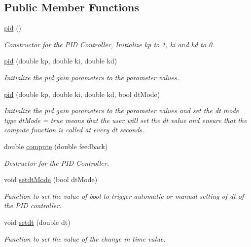 \subsection*{Public Member Functions}
\begin{DoxyCompactItemize}
\item 
\hyperlink{classpid_a8cb9ff8fa0e7162d275990d01fb1588d}{pid} ()
\begin{DoxyCompactList}\small\item\em Constructor for the P\+ID Controller, Initialize kp to 1, ki and kd to 0. \end{DoxyCompactList}\item 
\hyperlink{classpid_aca31b4446bc7cafef37bf0ed799433c5}{pid} (double kp, double ki, double kd)
\begin{DoxyCompactList}\small\item\em Initialize the pid gain parameters to the parameter values. \end{DoxyCompactList}\item 
\hyperlink{classpid_afa844eff521e7d10d13008bb1befe6fe}{pid} (double kp, double ki, double kd, bool dt\+Mode)
\begin{DoxyCompactList}\small\item\em Initialize the pid gain parameters to the parameter values and set the dt mode type dt\+Mode = true means that the user will set the dt value and ensure that the compute function is called at every dt seconds. \end{DoxyCompactList}\item 
double \hyperlink{classpid_a3cd146c6f8b82f884106d1686b74f095}{compute} (double feedback)
\begin{DoxyCompactList}\small\item\em Destructor for the P\+ID Controller. \end{DoxyCompactList}\item 
void \hyperlink{classpid_ad79422e5b67012c47eb967606343df35}{setdt\+Mode} (bool dt\+Mode)
\begin{DoxyCompactList}\small\item\em Function to set the value of bool to trigger automatic or manual setting of dt of the P\+ID controller. \end{DoxyCompactList}\item 
void \hyperlink{classpid_a6c035fb6eaa1ec6a4113c318571bfd8b}{setdt} (double dt)
\begin{DoxyCompactList}\small\item\em Function to set the value of the change in time value. \end{DoxyCompactList}\item 

\end{DoxyCompactItemize}
